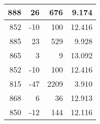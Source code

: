 \begin{longtable}{|r|r|r|r|}
	888                                                                                             & 26                                                & 676                                                  & 9.174                                                                                          \\ \hline
	852                                                                                             & -10                                               & 100                                                  & 12.416                                                                                         \\ \hline
	885                                                                                             & 23                                                & 529                                                  & 9.928                                                                                          \\ \hline
	865                                                                                             & 3                                                 & 9                                                    & 13.092                                                                                         \\ \hline
	852                                                                                             & -10                                               & 100                                                  & 12.416                                                                                         \\ \hline
	815                                                                                             & -47                                               & 2209                                                 & 3.910                                                                                          \\ \hline
	868                                                                                             & 6                                                 & 36                                                   & 12.913                                                                                         \\ \hline
	850                                                                                             & -12                                               & 144                                                  & 12.116                                                                                         \\ \hline

\end{longtable}
